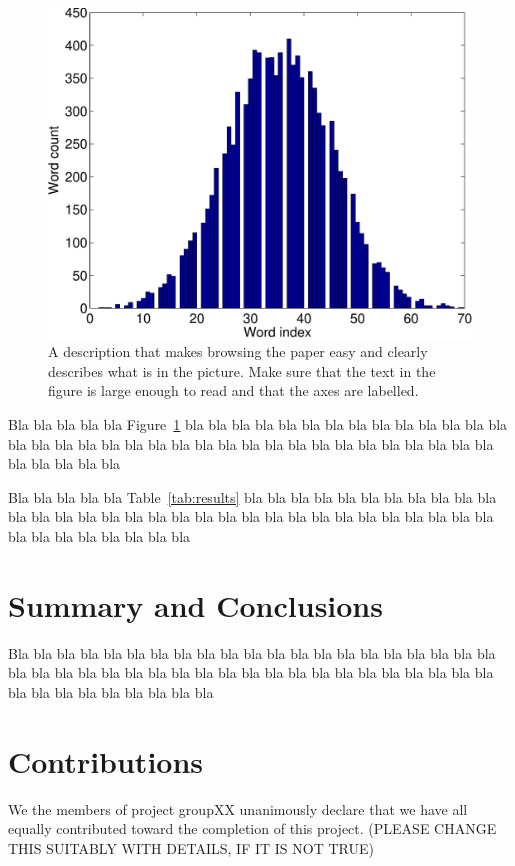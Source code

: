 \documentclass[a4paper,12pt]{article}
\begin{document}
\begin{figure}
\centering
\includegraphics[width=0.8\linewidth]{histogram}
\caption{A description that makes browsing the paper easy and clearly 
describes what is in the picture. Make sure that the text in the figure 
is large enough to read and that the axes are labelled.}
\label{fig:histogram}
\end{figure}

Bla bla bla bla bla Figure~\ref{fig:histogram} bla bla bla bla bla bla 
bla bla bla bla bla bla bla bla bla bla bla bla bla bla bla bla bla 
bla bla bla bla bla bla bla bla bla bla bla bla bla bla bla bla bla 


Bla bla bla bla bla Table~\ref{tab:results} bla bla bla bla bla bla 
bla bla bla bla bla bla bla bla bla bla bla bla bla bla bla bla bla 
bla bla bla bla bla bla bla bla bla bla bla bla bla bla bla bla bla 

\section{Summary and Conclusions}
\label{sec:summary}

Bla bla bla bla bla bla bla bla bla bla bla bla bla bla bla bla bla 
bla bla bla bla bla bla bla bla bla bla bla bla bla bla bla bla bla 
bla bla bla bla bla bla bla bla bla bla bla bla bla bla bla bla bla 


\section{Contributions}
\label{sec:contributions}
We the members of project groupXX unanimously declare that 
we have all equally contributed toward the completion of this
project. (PLEASE CHANGE THIS SUITABLY WITH DETAILS, IF IT IS NOT TRUE)




\end{document}
